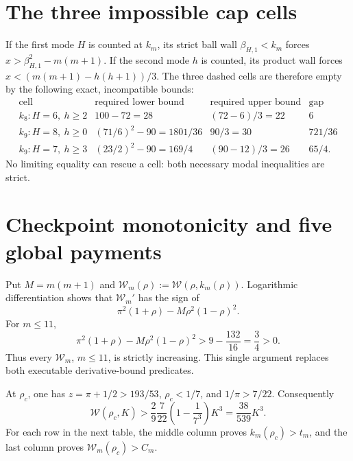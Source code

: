 \documentclass[11pt]{article}
\newcommand{\W}{\mathcal W}
\begin{document}
\section{The three impossible cap cells}

If the first mode \(H\) is counted at \(k_m\), its strict ball wall
\(\beta_{H,1}<k_m\) forces
\(x>\beta_{H,1}^2-m(m+1)\).  If the second mode \(h\) is counted, its
product wall forces
\(x<(m(m+1)-h(h+1))/3\).  The three dashed cells are therefore empty by
the following exact, incompatible bounds:
\begin{equation}
\begin{array}{c|c|c|c}
\text{cell}&\text{required lower bound}&\text{required upper bound}
&\text{gap}\\ \hline
k_8: H=6,\ h\ge2&100-72=28&(72-6)/3=22&6\\
k_9: H=8,\ h\ge0&(71/6)^2-90=1801/36&90/3=30&721/36\\
k_9: H=7,\ h\ge3&(23/2)^2-90=169/4&(90-12)/3=26&65/4.
\end{array}
\label{eq:impossible-cells}
\end{equation}
No limiting equality can rescue a cell: both necessary modal inequalities
are strict.

\section{Checkpoint monotonicity and five global payments}

Put \(M=m(m+1)\) and
\(\W_m(\rho):=\W(\rho,k_m(\rho))\).  Logarithmic differentiation shows
that \(\W_m'\) has the sign of
\begin{equation}
 \pi^2(1+\rho)-M\rho^2(1-\rho)^2.
 \label{eq:Wm-derivative}
\end{equation}
For \(m\leq11\),
\[
 \pi^2(1+\rho)-M\rho^2(1-\rho)^2
 >9-\frac{132}{16}=\frac34>0.
\]
Thus every \(\W_m\), \(m\leq11\), is strictly increasing.  This single
argument replaces both executable derivative-bound predicates.

At \(\rho_c\), one has \(z=\pi+1/2>193/53\),
\(\rho_c<1/7\), and \(1/\pi>7/22\).  Consequently
\begin{equation}
 \W(\rho_c,K)>
 \frac{2}{9}\frac7{22}\left(1-\frac1{7^3}\right)K^3
 =\frac{38}{539}K^3.
 \label{eq:global-coarse}
\end{equation}
For each row in the next table, the middle column proves
\(k_m(\rho_c)>t_m\), and the last column proves
\(\W_m(\rho_c)>C_m\).
\end{document}

